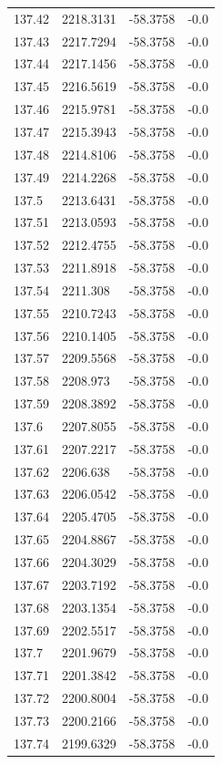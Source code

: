 \begin{table}[H]
\begin{tabular}{llll}
137.42 & 2218.3131 & -58.3758 & -0.0 \\
137.43 & 2217.7294 & -58.3758 & -0.0 \\
137.44 & 2217.1456 & -58.3758 & -0.0 \\
137.45 & 2216.5619 & -58.3758 & -0.0 \\
137.46 & 2215.9781 & -58.3758 & -0.0 \\
137.47 & 2215.3943 & -58.3758 & -0.0 \\
137.48 & 2214.8106 & -58.3758 & -0.0 \\
137.49 & 2214.2268 & -58.3758 & -0.0 \\
137.5 & 2213.6431 & -58.3758 & -0.0 \\
137.51 & 2213.0593 & -58.3758 & -0.0 \\
137.52 & 2212.4755 & -58.3758 & -0.0 \\
137.53 & 2211.8918 & -58.3758 & -0.0 \\
137.54 & 2211.308 & -58.3758 & -0.0 \\
137.55 & 2210.7243 & -58.3758 & -0.0 \\
137.56 & 2210.1405 & -58.3758 & -0.0 \\
137.57 & 2209.5568 & -58.3758 & -0.0 \\
137.58 & 2208.973 & -58.3758 & -0.0 \\
137.59 & 2208.3892 & -58.3758 & -0.0 \\
137.6 & 2207.8055 & -58.3758 & -0.0 \\
137.61 & 2207.2217 & -58.3758 & -0.0 \\
137.62 & 2206.638 & -58.3758 & -0.0 \\
137.63 & 2206.0542 & -58.3758 & -0.0 \\
137.64 & 2205.4705 & -58.3758 & -0.0 \\
137.65 & 2204.8867 & -58.3758 & -0.0 \\
137.66 & 2204.3029 & -58.3758 & -0.0 \\
137.67 & 2203.7192 & -58.3758 & -0.0 \\
137.68 & 2203.1354 & -58.3758 & -0.0 \\
137.69 & 2202.5517 & -58.3758 & -0.0 \\
137.7 & 2201.9679 & -58.3758 & -0.0 \\
137.71 & 2201.3842 & -58.3758 & -0.0 \\
137.72 & 2200.8004 & -58.3758 & -0.0 \\
137.73 & 2200.2166 & -58.3758 & -0.0 \\
137.74 & 2199.6329 & -58.3758 & -0.0 \\

\end{tabular}
\end{table}
